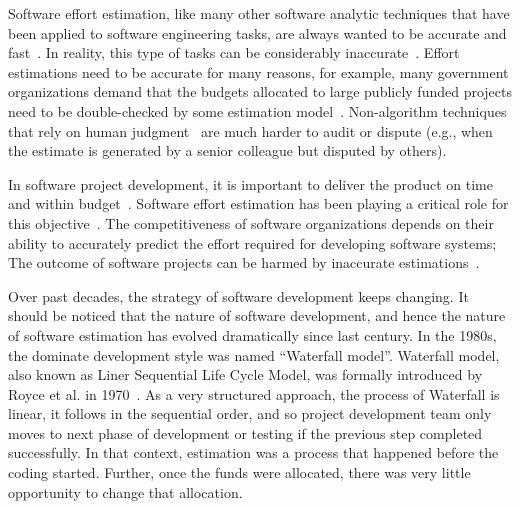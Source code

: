 
Software effort estimation, like many other software analytic techniques that have been applied to software engineering tasks, are always wanted to be accurate and fast~\cite{menzies2018software,nam2018heterogeneous}. 
In reality, this type of tasks can be 
considerably inaccurate~\cite{kemerer1987empirical}.  Effort estimations need to be accurate for many reasons, for example, many government organizations demand that the budgets allocated to large publicly funded projects need to be double-checked by some estimation model~\cite{MenziesNeg:2017}.  
Non-algorithm techniques that rely on human judgment~\cite{jorgensen2004review} are much harder to  
audit or 
dispute (e.g.,  when the estimate is generated by a senior colleague but disputed by others). 


In software project development, it is important to deliver the product on time and within  budget~\cite{briand2002resource,kocaguneli2011experiences,trendowicz2014software}. Software effort estimation has been playing a critical role for this objective~\cite{sarro2016multi}. The competitiveness of software
organizations depends on their ability to accurately predict the  effort  required  for  developing  software  systems; The outcome of software projects can be harmed by inaccurate estimations~\cite{trendowicz2014software,mcconnell2006software,mendes2002further,sommerville2010software}.

Over past decades, the strategy of software development keeps changing. It should be noticed that the nature of software development, and hence the nature of software estimation has evolved dramatically since last century. In the 1980s, the dominate development style was named ``Waterfall model''. Waterfall model, also known as Liner Sequential Life Cycle Model, was formally introduced by Royce et al. in 1970~\cite{royce1970software}. As a very structured approach, the process of Waterfall is linear, it follows in the sequential order, and so project development team only moves to next phase of development or testing if the previous step completed successfully. In that context, estimation was a process that happened before the coding started. Further, once the funds were allocated, there was very little opportunity to change that allocation.


